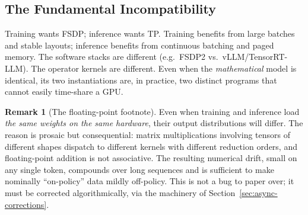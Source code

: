 \documentclass[11pt,a4paper]{article}
\theoremstyle{definition}
\newtheorem{remark}[definition]{Remark}
\theoremstyle{plain}
\begin{document}
\begin{center}
\end{center}

\subsection{The Fundamental Incompatibility}

Training wants FSDP; inference wants TP. Training benefits from large batches and stable layouts; inference benefits from continuous batching and paged memory. The software stacks are different (e.g.\ FSDP2 vs.\ vLLM/TensorRT-LLM). The operator kernels are different. Even when the \emph{mathematical} model is identical, its two instantiations are, in practice, two distinct programs that cannot easily time-share a GPU.

\begin{remark}[The floating-point footnote]\label{rem:fp}
Even when training and inference load \emph{the same weights on the same hardware}, their output distributions will differ. The reason is prosaic but consequential: matrix multiplications involving tensors of different shapes dispatch to different kernels with different reduction orders, and floating-point addition is not associative. The resulting numerical drift, small on any single token, compounds over long sequences and is sufficient to make nominally ``on-policy'' data mildly off-policy. This is not a bug to paper over; it must be corrected algorithmically, via the machinery of Section~\ref{sec:async-corrections}.
\end{remark}
\end{document}
